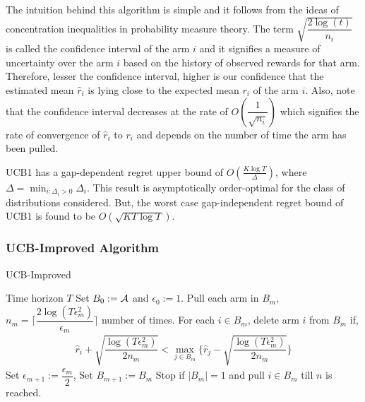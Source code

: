     The intuition behind this algorithm is simple and it follows from the ideas of concentration inequalities in probability measure theory. The term $\sqrt{\dfrac{2\log (t)}{n_i}}$ is called the confidence interval of the arm $i$ and it signifies a measure of uncertainty over the arm $i$ based on the history of observed rewards for that arm. Therefore, lesser the confidence interval, higher is our confidence that the estimated mean $\hat{r}_i$ is lying close to the expected mean $r_i$ of the arm $i$. Also, note that the confidence interval decreases at the rate of $O\left( \dfrac{1}{\sqrt{n_i}}\right)$ which signifies the rate of convergence of $\hat{r}_i$ to $r_i$ and depends on the number of time the arm has been pulled.
    
    UCB1 has a gap-dependent regret upper bound of  $O\left(\frac{K\log T}{\Delta}\right)$, where $\Delta = \min_{i:\Delta_i>0} \Delta_i$. This result is asymptotically order-optimal for the class of distributions considered. But, the worst case gap-independent regret bound of UCB1 is found to be  $O \left(\sqrt{KT\log T}\right)$. 
    
\subsubsection{UCB-Improved Algorithm}        
    
\begin{algorithm}[!th]
\caption{UCB-Improved}
\label{alg:ucbi}
\begin{algorithmic}[1]
 Time horizon $T$
 Set $B_{0}:= \mathcal{A}$ and $\epsilon_{0}:=1$.
\State Pull each arm in $B_m$, $n_{m}=\bigg\lceil\dfrac{2\log{( T\epsilon_{m}^{2})}}{\epsilon_{m}}\bigg\rceil$ number of times.
\ArmElim
\State For each $i \in B_{m}$, delete arm ${i}$ from $B_{m}$ if,
\begin{align*}
\hat{r}_{i} + \sqrt{\dfrac{\log{(T\epsilon_{m}^{2})}}{2 n_{m}}}  < \max_{{j}\in B_{m}}\bigg\lbrace\hat{r}_{j} -\sqrt{\dfrac{\log{( T\epsilon_{m}^{2})}}{2 n_{m}}} \bigg\rbrace
\end{align*}
\EndArmElim
\State Set $\epsilon_{m+1}:=\dfrac{\epsilon_{m}}{2}$, Set $B_{m+1}:=B_{m}$
\State Stop if $|B_{m}|=1$ and pull ${i}\in B_{m}$ till $n$ is reached.
\EndFor
\end{algorithmic}
\end{algorithm}
    
